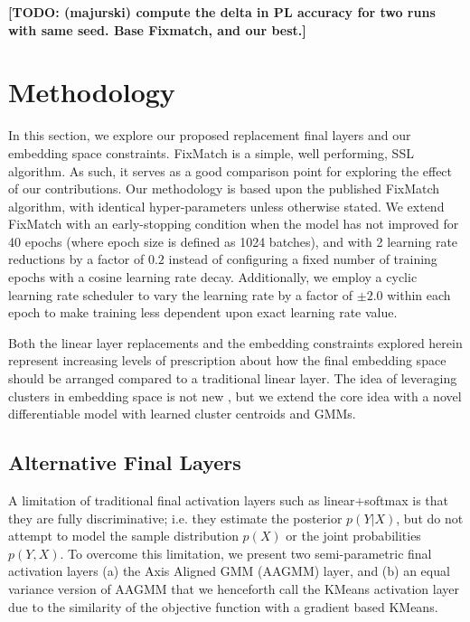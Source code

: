 \documentclass[10pt,twocolumn,letterpaper]{article}
\newcommand{\TODO}[1]{\textbf{\color{red}[TODO: #1]}}
\begin{document}


\TODO {(majurski) compute the delta in PL accuracy for two runs with same seed. Base Fixmatch, and our best.}

\section{Methodology}

In this section, we explore our proposed replacement final layers and our embedding space constraints.
FixMatch \cite{sohn2020fixmatch} is a simple, well performing, SSL algorithm.
As such, it serves as a good comparison point for exploring the effect of our contributions.
Our methodology is based upon the published FixMatch \cite{sohn2020fixmatch} algorithm, with identical hyper-parameters unless otherwise stated.
We extend FixMatch with an early-stopping condition when the model has not improved for 40 epochs (where epoch size is defined as 1024 batches), and with 2 learning rate reductions by a factor of $0.2$ instead of configuring a fixed number of training epochs with a cosine learning rate decay.
Additionally, we employ a cyclic learning rate scheduler to vary the learning rate by a factor of $\pm2.0$ within each epoch to make training less dependent upon exact learning rate value.

Both the linear layer replacements and the embedding constraints explored herein represent increasing levels of prescription about how the final embedding space should be arranged compared to a traditional linear layer.
The idea of leveraging clusters in embedding space is not new \cite{caron2018deep,caron2020unsupervised,enguehard2019semi}, but we extend the core idea with a novel differentiable model with learned cluster centroids and GMMs.

\subsection{Alternative Final Layers}

A limitation of traditional final activation layers such as linear+softmax is that they are fully discriminative; i.e. they estimate the posterior $p(Y|X)$, but do not attempt to model the sample distribution $p(X)$ or the joint probabilities $p(Y,X)$. 
To overcome this limitation, we present two semi-parametric final activation layers (a) the Axis Aligned GMM (AAGMM) layer, and (b) an equal variance version of AAGMM that we henceforth call the KMeans activation layer due to the similarity of the objective function with a gradient based KMeans.
\end{document}

